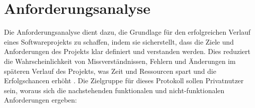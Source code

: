 \chapter{Anforderungsanalyse}



Die Anforderungsanalyse dient dazu, die Grundlage für den erfolgreichen Verlauf eines Softwareprojekts zu schaffen, indem sie sicherstellt, dass die Ziele und Anforderungen des Projekts klar definiert und verstanden werden. Dies reduziert die Wahrscheinlichkeit von Missverständnissen, Fehlern und Änderungen im späteren Verlauf des Projekts, was Zeit und Ressourcen spart und die Erfolgschancen erhöht \parencite{Zakharyan_SoftwareRequirementsForMessagingService}. Die Zielgruppe für dieses Protokoll sollen Privatnutzer sein, woraus sich die nachstehenden funktionalen und nicht-funktionalen Anforderungen ergeben:



